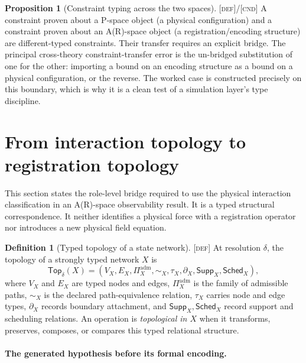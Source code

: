 \documentclass[11pt]{article}
\newcommand{\Sched}{\ensuremath{\mathsf{Sched}}}
\newcommand{\Supp}{\ensuremath{\mathsf{Supp}}}
\newcommand{\Top}{\ensuremath{\mathsf{Top}}}
\newcommand{\Defn}{\textsc{[def]}}
\newcommand{\Cnd}{\textsc{[cnd]}}
\theoremstyle{definition}
\newtheorem{sdefinition}{Definition}
\newtheorem{sproposition}{Proposition}
\begin{document}
\begin{sproposition}[Constraint typing across the two spaces]\label{prop:typing}
\Defn{}/\Cnd{} A constraint proven about a P-space object (a physical
configuration) and a constraint proven about an A(R)-space object (a
registration/encoding structure) are different-typed constraints. Their transfer
requires an explicit bridge. The principal cross-theory constraint-transfer error
is the un-bridged substitution of one for the other: importing a bound on an
encoding structure as a bound on a physical configuration, or the reverse. The
worked case is constructed precisely on this boundary, which is why it is a clean
test of a simulation layer's type discipline.
\end{sproposition}


\section{From interaction topology to registration topology}
\label{supp:topological-bridge}

This section states the role-level bridge required to use the physical interaction
classification in an A(R)-space observability result. It is a typed structural
correspondence. It neither identifies a physical force with a registration operator
nor introduces a new physical field equation.

\begin{sdefinition}[Typed topology of a state network]
\label{def:typed-topology}
\Defn{} At resolution $\delta$, the topology of a strongly typed network $X$ is
\begin{equation}
\Top_\delta(X)=
\left(V_X,E_X,\Pi_X^{\mathrm{adm}},\sim_X,\tau_X,\partial_X,
\Supp_X,\Sched_X\right),
\label{eq:typed-topology-supp}
\end{equation}
where $V_X$ and $E_X$ are typed nodes and edges,
$\Pi_X^{\mathrm{adm}}$ is the family of admissible paths, $\sim_X$ is the
declared path-equivalence relation, $\tau_X$ carries node and edge types,
$\partial_X$ records boundary attachment, and $\Supp_X,\Sched_X$ record support
and scheduling relations. An operation is \emph{topological in $X$} when it
transforms, preserves, composes, or compares this typed relational structure.
\end{sdefinition}

\paragraph{The generated hypothesis before its formal encoding.}
\end{document}
